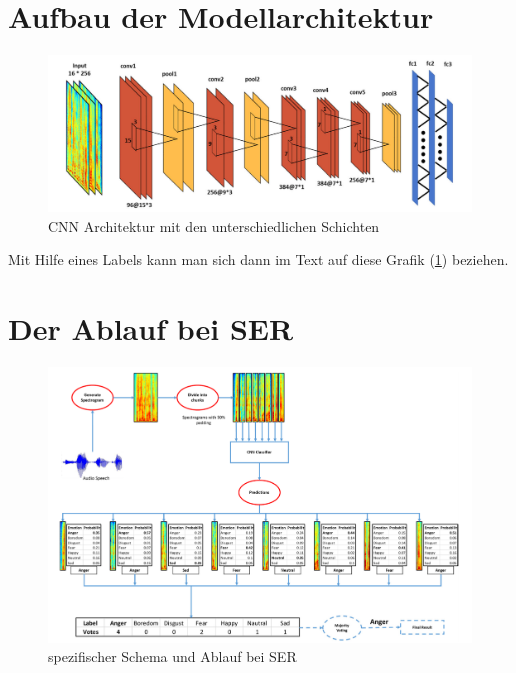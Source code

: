 \section{Aufbau der Modellarchitektur}


\begin{figure}[ht]
    \centering
    \includegraphics[width=1\textwidth]{images/conv}
    \caption{\label{architektur}CNN Architektur mit den unterschiedlichen Schichten \cite{badshah2019deep}}
\end{figure}

Mit Hilfe eines Labels kann man sich dann im Text auf diese Grafik (\ref{architektur}) beziehen. 



\section{Der Ablauf bei SER}

\begin{figure}[ht]
	\centering
	\includegraphics[width=1\textwidth]{images/ablauf}
	\caption{\label{ablauf}spezifischer Schema und Ablauf bei SER \cite{badshah2019deep}}
\end{figure}




